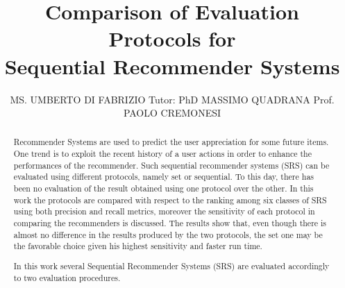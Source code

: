 \documentclass[prodmode,acmtecs]{acmsmall} %
\begin{document}

\title{Comparison of Evaluation Protocols for\\ Sequential Recommender Systems }
\author{
MS. UMBERTO DI FABRIZIO
Tutor: PhD MASSIMO QUADRANA
Prof. PAOLO CREMONESI
}
\begin{abstract}
Recommender Systems are used to predict the user appreciation for some future items. One trend is to exploit the recent history of a user actions in order to enhance the performances of the recommender. Such sequential recommender systems (SRS) can be evaluated using different protocols, namely set or sequential. To this day, there has been no evaluation of the result obtained using one protocol over the other. In this work the protocols are compared with respect to the ranking among six classes of SRS using both precision and recall metrics, moreover the sensitivity of each protocol in comparing the recommenders is discussed. The results show that, even though there is almost no difference in the results produced by the two protocols, the set one may be the favorable choice given his highest sensitivity and faster run time.  
\end{abstract}
 

\maketitle


\begin{abstract}
	In this work several Sequential Recommender Systems (SRS) are evaluated accordingly to two evaluation procedures.
\end{abstract}


\end{document}

